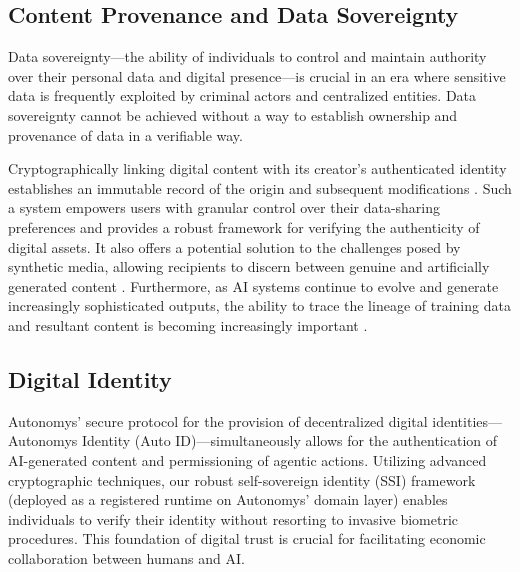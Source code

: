 \documentclass[conference]{IEEEtran}
\begin{document}
\subsection{Content Provenance and Data Sovereignty}

Data sovereignty—the ability of individuals to control and maintain authority over their personal data and digital presence—is crucial in an era where sensitive data is frequently exploited by criminal actors and centralized entities. Data sovereignty cannot be achieved without a way to establish ownership and provenance of data in a verifiable way.

Cryptographically linking digital content with its creator's authenticated identity establishes an immutable record of the origin and subsequent modifications \cite{hasan2009}. Such a system empowers users with granular control over their data-sharing preferences and provides a robust framework for verifying the authenticity of digital assets. It also offers a potential solution to the challenges posed by synthetic media, allowing recipients to discern between genuine and artificially generated content \cite{westerlund2019}. Furthermore, as AI systems continue to evolve and generate increasingly sophisticated outputs, the ability to trace the lineage of training data and resultant content is becoming increasingly important \cite{brundage2020}.

\subsection{Digital Identity}

Autonomys' secure protocol for the provision of decentralized digital identities—Autonomys Identity (Auto ID)—simultaneously allows for the authentication of AI-generated content and permissioning of agentic actions. Utilizing advanced cryptographic techniques, our robust self-sovereign identity (SSI) framework (deployed as a registered runtime on Autonomys' domain layer) enables individuals to verify their identity without resorting to invasive biometric procedures. This foundation of digital trust is crucial for facilitating economic collaboration between humans and AI.
\end{document}
